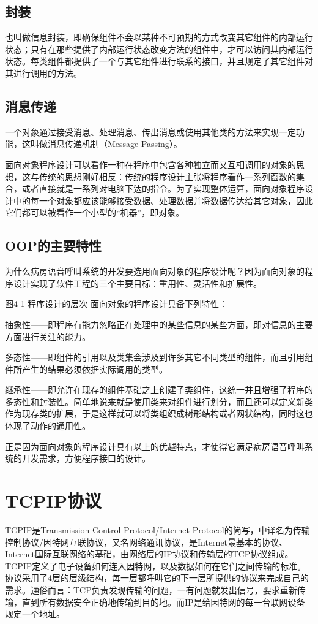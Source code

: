 \subsection{封装}
也叫做信息封装，即确保组件不会以某种不可预期的方式改变其它组件的内部运行状态；只有在那些提供了内部运行状态改变方法的组件中，才可以访问其内部运行状态。每类组件都提供了一个与其它组件进行联系的接口，并且规定了其它组件对其进行调用的方法。

\subsection{消息传递}
一个对象通过接受消息、处理消息、传出消息或使用其他类的方法来实现一定功能，这叫做消息传递机制（Message Passing）。

面向对象程序设计可以看作一种在程序中包含各种独立而又互相调用的对象的思想，这与传统的思想刚好相反：传统的程序设计主张将程序看作一系列函数的集合，或者直接就是一系列对电脑下达的指令。为了实现整体运算，面向对象程序设计中的每一个对象都应该能够接受数据、处理数据并将数据传达给其它对象，因此它们都可以被看作一个小型的“机器”，即对象。

\subsection{\acrshort{OOP}的主要特性}
为什么病房语音呼叫系统的开发要选用面向对象的程序设计呢？因为面向对象的程序设计实现了软件工程的三个主要目标：重用性、灵活性和扩展性。
 
图4-1	程序设计的层次
面向对象的程序设计具备下列特性：

抽象性——即程序有能力忽略正在处理中的某些信息的某些方面，即对信息的主要方面进行关注的能力。

多态性——即组件的引用以及类集会涉及到许多其它不同类型的组件，而且引用组件所产生的结果必须依据实际调用的类型。

继承性——即允许在现存的组件基础之上创建子类组件，这统一并且增强了程序的多态性和封装性。简单地说来就是使用类来对组件进行划分，而且还可以定义新类作为现存类的扩展，于是这样就可以将类组织成树形结构或者网状结构，同时这也体现了动作的通用性。

正是因为面向对象的程序设计具有以上的优越特点，才使得它满足病房语音呼叫系统的开发需求，方便程序接口的设计。

\section{\acrshort{TCPIP}协议}
\acrshort{TCPIP}是Transmission Control Protocol/Internet Protocol的简写，中译名为传输控制协议/因特网互联协议，又名网络通讯协议，是Internet最基本的协议、Internet国际互联网络的基础，由网络层的IP协议和传输层的TCP协议组成。\acrshort{TCPIP}定义了电子设备如何连入因特网，以及数据如何在它们之间传输的标准。协议采用了4层的层级结构，每一层都呼叫它的下一层所提供的协议来完成自己的需求。通俗而言：TCP负责发现传输的问题，一有问题就发出信号，要求重新传输，直到所有数据安全正确地传输到目的地。而IP是给因特网的每一台联网设备规定一个地址。

